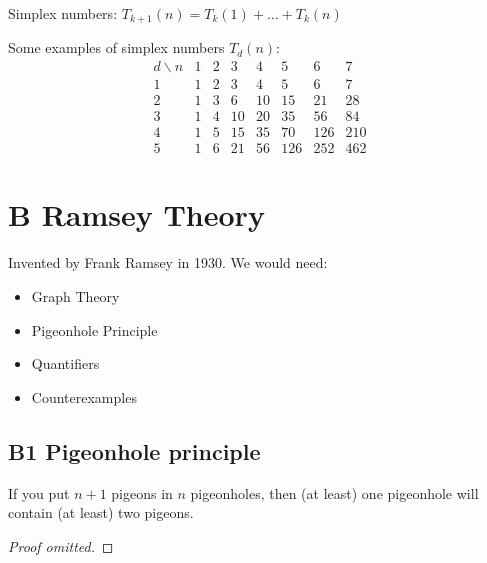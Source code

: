 \documentclass[12pt]{article}
\begin{document}
 Simplex numbers: $T_{k+1}(n) = T_k(1) + \dots +T_k(n)$

Some examples of simplex numbers $T_d(n)$:
$$
\begin{array}{cccccccc}
d\backslash n & 1 & 2 & 3 & 4 & 5 & 6 & 7 \\
1 & 1 & 2 & 3 & 4 & 5 & 6 & 7 \\
2 & 1 & 3 & 6 & 10 & 15 & 21 & 28 \\
3 & 1 & 4 & 10 & 20 & 35 & 56 & 84 \\
4 & 1 & 5 & 15 & 35 & 70 & 126 & 210 \\
5 & 1 & 6 & 21 & 56 & 126 & 252 & 462
\end{array}
$$

\section{B Ramsey Theory}
Invented by Frank Ramsey in 1930. We would need:
\begin{itemize}
    \item Graph Theory
    \item Pigeonhole Principle
    \item Quantifiers
    \item Counterexamples
\end{itemize}

\subsection{B1 Pigeonhole principle}
\begin{theorem}
    If you put $n+1$ pigeons in $n$ pigeonholes, then (at least) one pigeonhole will contain (at least) two pigeons.
\end{theorem}
\begin{proof}[Proof omitted]
\end{proof}
\end{document}
